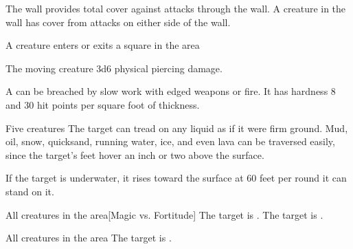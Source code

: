 The wall provides total cover against attacks through the wall. A creature in the wall has cover from attacks on either side of the wall.
\begin{spelltrigger}{A creature enters or exits a square in the area}
    \begin{spelltarget}{The moving creature}
        \spelleffect 3d6 physical piercing damage.
    \end{spelltarget}
\end{spelltrigger}
\spellnotes A  can be breached by slow work with edged weapons or fire. It has hardness 8 and 30 hit points per square foot of thickness.

\spelldur{\durlong \dismissable}
\begin{spelltargets}{Five creatures}
    \spelleffect The target can tread on any liquid as if it were firm ground. Mud, oil, snow, quicksand, running water, ice, and even lava can be traversed easily, since the target's feet hover an inch or two above the surface.
    \par If the target is underwater, it rises toward the surface at 60 feet per round it can stand on it.
\end{spelltargets}

\spelldur{\durshort}
\begin{spelltargets}{All creatures in the area}[Magic vs. Fortitude]
    \spellsuccess The target is \exhausted.
    \spellfailure The target is \fatigued.
\end{spelltargets}

\spelldur{\durshort}
\begin{spelltargets}{All creatures in the area}
    \spelleffect The target is \fatigued.
\end{spelltargets}

